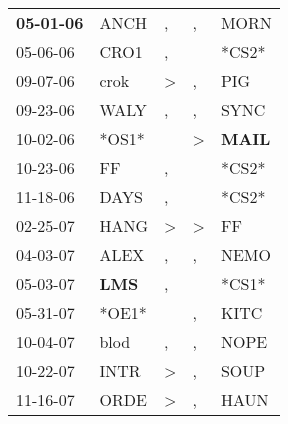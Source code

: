 \begin{supertabular}{p{0.07\textwidth}p{0.06\textwidth}p{0.02\textwidth}p{0.02\textwidth}p{0.06\textwidth}}
 \textbf{05-01-06\textsuperscript{}} &           ANCH\textsuperscript{} &                , &                , &           MORN\textsuperscript{} \\
          05-06-06\textsuperscript{} &           CRO1\textsuperscript{} &                , &                  &                            *CS2* \\
          09-07-06\textsuperscript{} &           crok\textsuperscript{} &     \textgreater &                , &            PIG\textsuperscript{} \\
          09-23-06\textsuperscript{} &           WALY\textsuperscript{} &                , &                , &           SYNC\textsuperscript{} \\
          10-02-06\textsuperscript{} &                            *OS1* &                  &     \textgreater &  \textbf{MAIL\textsuperscript{}} \\
          10-23-06\textsuperscript{} &             FF\textsuperscript{} &                , &                  &                            *CS2* \\
          11-18-06\textsuperscript{} &           DAYS\textsuperscript{} &                , &                  &                            *CS2* \\
          02-25-07\textsuperscript{} &           HANG\textsuperscript{} &     \textgreater &     \textgreater &             FF\textsuperscript{} \\
          04-03-07\textsuperscript{} &           ALEX\textsuperscript{} &                , &                , &           NEMO\textsuperscript{} \\
          05-03-07\textsuperscript{} &   \textbf{LMS\textsuperscript{}} &                , &                  &                            *CS1* \\
          05-31-07\textsuperscript{} &                            *OE1* &                  &                , &           KITC\textsuperscript{} \\
          10-04-07\textsuperscript{} &           blod\textsuperscript{} &                , &                , &           NOPE\textsuperscript{} \\
          10-22-07\textsuperscript{} &           INTR\textsuperscript{} &     \textgreater &                , &           SOUP\textsuperscript{} \\
          11-16-07\textsuperscript{} &           ORDE\textsuperscript{} &     \textgreater &                , &           HAUN\textsuperscript{} \\

\end{supertabular}
